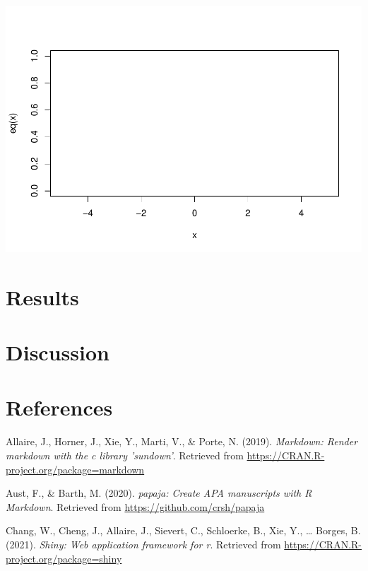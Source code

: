 \documentclass[
  english,
  man]{apa6}
\begin{document}
\includegraphics{ICC_project_files/figure-latex/unnamed-chunk-5-1.pdf}

\hypertarget{results}{%
\section{Results}\label{results}}

\hypertarget{discussion}{%
\section{Discussion}\label{discussion}}

\newpage

\hypertarget{references}{%
\section{References}\label{references}}

\begingroup
\setlength{\parindent}{-0.5in}
\setlength{\leftskip}{0.5in}

\hypertarget{refs}{}
\leavevmode\hypertarget{ref-R-markdown}{}%
Allaire, J., Horner, J., Xie, Y., Marti, V., \& Porte, N. (2019). \emph{Markdown: Render markdown with the c library 'sundown'}. Retrieved from \url{https://CRAN.R-project.org/package=markdown}

\leavevmode\hypertarget{ref-R-papaja}{}%
Aust, F., \& Barth, M. (2020). \emph{papaja: Create APA manuscripts with R Markdown}. Retrieved from \url{https://github.com/crsh/papaja}

\leavevmode\hypertarget{ref-R-shiny}{}%
Chang, W., Cheng, J., Allaire, J., Sievert, C., Schloerke, B., Xie, Y., \ldots{} Borges, B. (2021). \emph{Shiny: Web application framework for r}. Retrieved from \url{https://CRAN.R-project.org/package=shiny}
\end{document}
